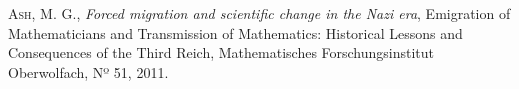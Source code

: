 \documentclass[a4paper,10pt,twoside]{article}
\begin{document}
\begin{thebibliography}{9}


\textsc{Ash}, M. G.,
\textit{Forced migration and scientific change in the Nazi era}, 
Emigration of Mathematicians and Transmission of Mathematics: Historical Lessons and Consequences of the Third Reich,
Mathematisches Forschungsinstitut Oberwolfach, Nº 51, 2011.

\begin{comment}%
\bibitem{butzer}
\textsc{Butzer}, P., \textsc{Volkmann}, L.,
\textit{Otto Blumenthal (1876-1944) in retrospect}, 
Journal of Approximation Theory, Nº 138, pp. 1--36, november 2005.

\bibitem{fernandez}
\textsc{Fernández}, S.,
\textit{La Criptografía Clásica}, Revista SIGMA, Nº 24, pp. 119--141, abril 2004.

\bibitem{garron}
\textsc{Garron}, L., 
\textit{National Socialism and the Death of German Mathematics}, 
Stanford-in-Berlin Program course ``Science, Medicine, and Technology in Nazi Germany'',
december 2010.

\bibitem{hodges}
\textsc{Hodges}, A., 
\textit{The Military Use of Alan Turing}, 
Mathematics and War, pp. 312--325, Bernhelm Booss Bavnbek and Jens H\o{}yrup Editors, Birkhäuser,
2003.

\bibitem{lahoz}
\textsc{Lahoz-Beltrá}, R., 
\textit{Turing: Del primer ordenador a la inteligencia artificial}, 
Colección: La matemática y sus personajes, Nº 24, 1ª Edición. Nívola, Madrid, 2005.

\bibitem{maclane}
\textsc{MacLane}, S., 
\textit{Mathematics at Göttingen under the Nazis},
Notices of AMS, Vol. 42, Nº 10, october 1995.

\bibitem{miller}
\textsc{Miller}, A. R., 
\textit{The Criptographic Mathematics of Enigma},
Center for Crypologic History, 1996.

\bibitem{oberdiek}
\textsc{Oberdiek}, A., 
\textit{Göttinger Universitäts-Bauten. Die Baugeschichte der
Georg-August-Univeristät}, Verlag Göttinger Tageblatt \textsc{GMBH \& CO. KG}, p. 46, 1989.

\bibitem{remmert}
\textsc{Remmert}, V. R., 
\textit{Mathematical Publishing in the Third Reich: Springer-Verlag and the Deutsche Mathematiker-Vereinigung},
The Mathematical Intelligencer, Springer-Verlag, New York, 2000.

\bibitem{segal}
\textsc{Segal}, S. L., 
\textit{Mathematicians under Nazis},
Princeton University Press, 2003.


\end{comment}
\end{thebibliography}
\end{document}
